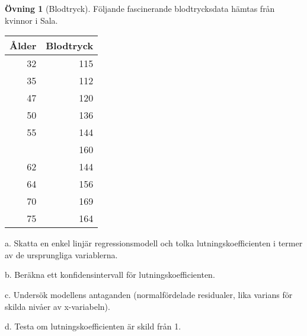 \documentclass[
]{book}
\theoremstyle{definition}
\theoremstyle{definition}
\theoremstyle{definition}
\newtheorem{exercise}{Övning}[chapter]
\theoremstyle{definition}
\theoremstyle{remark}
\begin{document}
\begin{exercise}[Blodtryck]
Följande fascinerande blodtrycksdata hämtas från kvinnor i Sala.

\begin{table}
\centering
\begin{tabular}[t]{rr}
\toprule
Ålder & Blodtryck\\
\midrule
32 & 115\\
35 & 112\\
47 & 120\\
50 & 136\\
55 & 144\\
\addlinespace
60 & 160\\
62 & 144\\
64 & 156\\
70 & 169\\
75 & 164\\
\bottomrule
\end{tabular}
\end{table}

a. Skatta en enkel linjär regressionsmodell och tolka lutningskoefficienten i termer av de ursprungliga variablerna.

b. Beräkna ett konfidensintervall för lutningskoefficienten.

c. Undersök modellens antaganden (normalfördelade residualer, lika varians för skilda nivåer av x-variabeln).

d. Testa om lutningskoefficienten är skild från 1.
\end{exercise}
\end{document}
